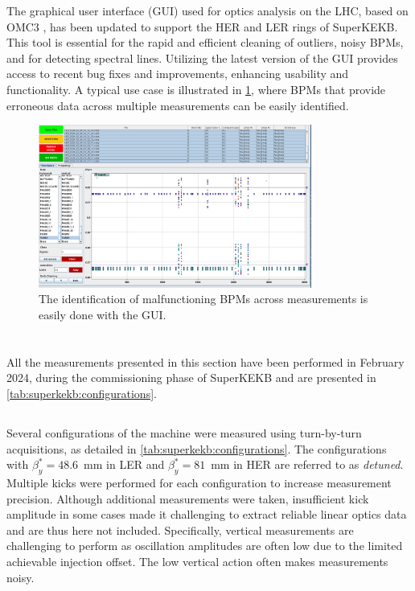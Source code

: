 The graphical user interface (GUI) used for optics analysis on the LHC, based on OMC3
\cite{omc-team_omc3_2021}, has been updated to support the HER and LER rings of SuperKEKB. This tool
is essential for the rapid and efficient cleaning of outliers, noisy BPMs, and for detecting spectral
lines. Utilizing the latest version of the GUI provides access to recent bug fixes and improvements,
enhancing usability and functionality. A typical use case is illustrated in
\cref{fig:kek:gui_bad_bpms}, where BPMs that provide erroneous data across multiple measurements can
be easily identified.

\begin{figure}[!htb]
    \centering
    \includegraphics[width=0.8\textwidth]{./images/kek/GUIbadbpm.png}
    \caption{The identification of malfunctioning BPMs across measurements is easily done with the GUI.}
    \label{fig:kek:gui_bad_bpms}
\end{figure}



\FloatBarrier
\section{}

All the measurements presented in this section have been performed in February 2024, during the
commissioning phase of SuperKEKB and are presented in \cref{tab:superkekb:configurations}.

\subsection{}

Several configurations of the machine were measured using turn-by-turn acquisitions, as detailed in
\cref{tab:superkekb:configurations}. The configurations with $\beta_y^* = 48.6$~mm in LER and
$\beta_y^* = 81$~mm in HER are referred to as \textit{detuned}. Multiple kicks were performed for each
configuration to increase measurement precision. Although additional measurements were taken,
insufficient kick amplitude in some cases made it challenging to extract reliable linear optics
data and are thus here not included. Specifically, vertical measurements are challenging to perform
as oscillation amplitudes are often low due to the limited achievable injection offset. The low 
vertical action often makes measurements noisy.

